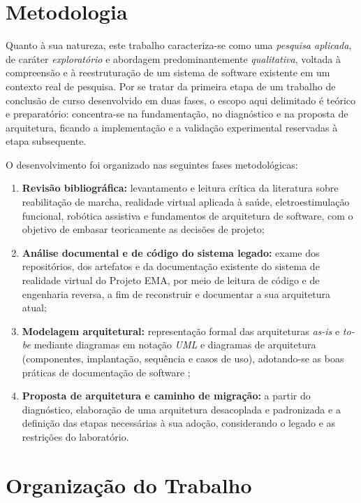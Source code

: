 \section{Metodologia}

Quanto à sua natureza, este trabalho caracteriza-se como uma \emph{pesquisa aplicada},
de caráter \emph{exploratório} e abordagem predominantemente \emph{qualitativa}, voltada
à compreensão e à reestruturação de um sistema de software existente em um contexto real
de pesquisa. Por se tratar da primeira etapa de um trabalho de conclusão de curso
desenvolvido em duas fases, o escopo aqui delimitado é teórico e preparatório: concentra-se
na fundamentação, no diagnóstico e na proposta de arquitetura, ficando a implementação e
a validação experimental reservadas à etapa subsequente.

O desenvolvimento foi organizado nas seguintes fases metodológicas:

\begin{enumerate}
	\item \textbf{Revisão bibliográfica:} levantamento e leitura crítica da literatura
	      sobre reabilitação de marcha, realidade virtual aplicada à saúde,
	      eletroestimulação funcional, robótica assistiva e fundamentos de arquitetura de
	      software, com o objetivo de embasar teoricamente as decisões de projeto;
	\item \textbf{Análise documental e de código do sistema legado:} exame dos
	      repositórios, dos artefatos e da documentação existente do sistema de realidade
	      virtual do Projeto EMA, por meio de leitura de código e de engenharia reversa,
	      a fim de reconstruir e documentar a sua arquitetura atual;
	\item \textbf{Modelagem arquitetural:} representação formal das arquiteturas
	      \emph{as-is} e \emph{to-be} mediante diagramas em notação \emph{UML} e diagramas
	      de arquitetura (componentes, implantação, sequência e casos de uso),
	      adotando-se as boas práticas de documentação de software \cite{sommerville2011};
	\item \textbf{Proposta de arquitetura e caminho de migração:} a partir do
	      diagnóstico, elaboração de uma arquitetura desacoplada e padronizada e a
	      definição das etapas necessárias à sua adoção, considerando o legado e as
	      restrições do laboratório.
\end{enumerate}

\section{Organização do Trabalho}

